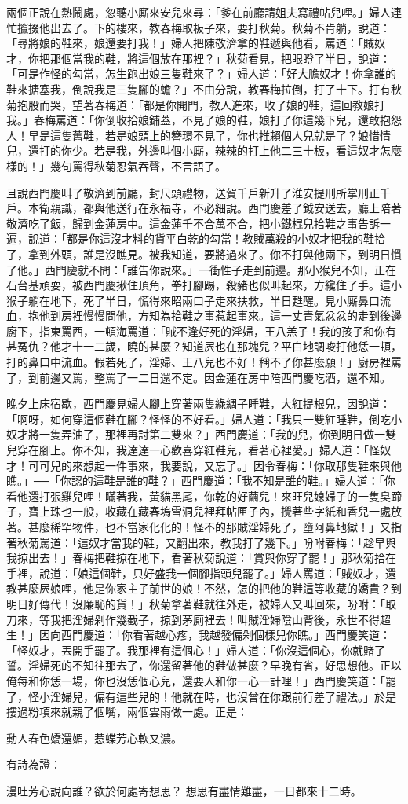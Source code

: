 兩個正說在熱鬧處，忽聽小廝來安兒來尋：「爹在前廳請姐夫寫禮帖兒哩。」婦人連忙攛掇他出去了。下的樓來，教春梅取板子來，要打秋菊。秋菊不肯躺，說道： 「尋將娘的鞋來，娘還要打我！」婦人把陳敬濟拿的鞋遞與他看，罵道：「賊奴才，你把那個當我的鞋，將這個放在那裡？」秋菊看見，把眼瞪了半日，說道：「可是作怪的勾當，怎生跑出娘三隻鞋來了？」婦人道：「好大膽奴才！你拿誰的鞋來搪塞我，倒說我是三隻腳的蟾？」不由分說，教春梅拉倒，打了十下。打有秋菊抱股而哭，望著春梅道：「都是你開門，教人進來，收了娘的鞋，這回教娘打我。」春梅罵道：「你倒收拾娘鋪蓋，不見了娘的鞋，娘打了你這幾下兒，還敢抱怨人！早是這隻舊鞋，若是娘頭上的簪環不見了，你也推賴個人兒就是了？娘惜情兒，還打的你少。若是我，外邊叫個小廝，辣辣的打上他二三十板，看這奴才怎麼樣的！」幾句罵得秋菊忍氣吞聲，不言語了。

且說西門慶叫了敬濟到前廳，封尺頭禮物，送賀千戶新升了淮安提刑所掌刑正千戶。本衛親識，都與他送行在永福寺，不必細說。西門慶差了鉞安送去，廳上陪著敬濟吃了飯，歸到金蓮房中。這金蓮千不合萬不合，把小鐵棍兒拾鞋之事告訴一遍，說道：「都是你這沒才料的貨平白乾的勾當！教賊萬殺的小奴才把我的鞋拾了，拿到外頭，誰是沒瞧見。被我知道，要將過來了。你不打與他兩下，到明日慣了他。」西門慶就不問：「誰告你說來。」一衝性子走到前邊。那小猴兒不知，正在石台基頑耍，被西門慶揪住頂角，拳打腳踢，殺豬也似叫起來，方纔住了手。這小猴子躺在地下，死了半日，慌得來昭兩口子走來扶救，半日甦醒。見小廝鼻口流血，抱他到房裡慢慢問他，方知為拾鞋之事惹起事來。這一丈青氣忿忿的走到後邊廚下，指東罵西，一頓海罵道：「賊不逢好死的淫婦，王八羔子！我的孩子和你有甚冤仇？他才十一二歲，曉的甚麼？知道屄也在那塊兒？平白地調唆打他恁一頓，打的鼻口中流血。假若死了，淫婦、王八兒也不好！稱不了你甚麼願！」廚房裡罵了，到前邊又罵，整罵了一二日還不定。因金蓮在房中陪西門慶吃酒，還不知。

晚夕上床宿歇，西門慶見婦人腳上穿著兩隻綠綢子睡鞋，大紅提根兒，因說道：「啊呀，如何穿這個鞋在腳？怪怪的不好看。」婦人道：「我只一雙紅睡鞋，倒吃小奴才將一隻弄油了，那裡再討第二雙來？」西門慶道：「我的兒，你到明日做一雙兒穿在腳上。你不知，我達達一心歡喜穿紅鞋兒，看著心裡愛。」婦人道：「怪奴才！可可兒的來想起一件事來，我要說，又忘了。」因令春梅：「你取那隻鞋來與他瞧。」──「你認的這鞋是誰的鞋？」西門慶道：「我不知是誰的鞋。」婦人道：「你看他還打張雞兒哩！瞞著我，黃貓黑尾，你乾的好繭兒！來旺兒媳婦子的一隻臭蹄子，寶上珠也一般，收藏在藏春塢雪洞兒裡拜帖匣子內，攪著些字紙和香兒一處放著。甚麼稀罕物件，也不當家化化的！怪不的那賊淫婦死了，墮阿鼻地獄！」又指著秋菊罵道：「這奴才當我的鞋，又翻出來，教我打了幾下。」吩咐春梅：「趁早與我掠出去！」春梅把鞋掠在地下，看著秋菊說道：「賞與你穿了罷！」那秋菊拾在手裡，說道：「娘這個鞋，只好盛我一個腳指頭兒罷了。」婦人罵道：「賊奴才，還教甚麼屄娘哩，他是你家主子前世的娘！不然，怎的把他的鞋這等收藏的嬌貴？到明日好傳代！沒廉恥的貨！」秋菊拿著鞋就往外走，被婦人又叫回來，吩咐：「取刀來，等我把淫婦剁作幾截子，掠到茅廁裡去！叫賊淫婦陰山背後，永世不得超生！」因向西門慶道：「你看著越心疼，我越發偏剁個樣兒你瞧。」西門慶笑道：「怪奴才，丟開手罷了。我那裡有這個心！」婦人道：「你沒這個心，你就賭了誓。淫婦死的不知往那去了，你還留著他的鞋做甚麼？早晚有省，好思想他。正以俺每和你恁一場，你也沒恁個心兒，還要人和你一心一計哩！」西門慶笑道：「罷了，怪小淫婦兒，偏有這些兒的！他就在時，也沒曾在你跟前行差了禮法。」於是摟過粉項來就親了個嘴，兩個雲雨做一處。正是：

動人春色嬌還媚，惹蝶芳心軟又濃。

有詩為證：

漫吐芳心說向誰？欲於何處寄想思？
想思有盡情難盡，一日都來十二時。


